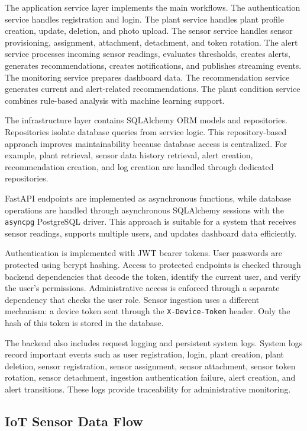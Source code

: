 The application service layer implements the main workflows. The authentication service handles registration and login. The plant service handles plant profile creation, update, deletion, and photo upload. The sensor service handles sensor provisioning, assignment, attachment, detachment, and token rotation. The alert service processes incoming sensor readings, evaluates thresholds, creates alerts, generates recommendations, creates notifications, and publishes streaming events. The monitoring service prepares dashboard data. The recommendation service generates current and alert-related recommendations. The plant condition service combines rule-based analysis with machine learning support.

The infrastructure layer contains SQLAlchemy ORM models and repositories. Repositories isolate database queries from service logic. This repository-based approach improves maintainability because database access is centralized. For example, plant retrieval, sensor data history retrieval, alert creation, recommendation creation, and log creation are handled through dedicated repositories.

FastAPI endpoints are implemented as asynchronous functions, while database operations are handled through asynchronous SQLAlchemy sessions with the \texttt{asyncpg} PostgreSQL driver. This approach is suitable for a system that receives sensor readings, supports multiple users, and updates dashboard data efficiently.

Authentication is implemented with JWT bearer tokens. User passwords are protected using bcrypt hashing. Access to protected endpoints is checked through backend dependencies that decode the token, identify the current user, and verify the user's permissions. Administrative access is enforced through a separate dependency that checks the user role. Sensor ingestion uses a different mechanism: a device token sent through the \texttt{X-Device-Token} header. Only the hash of this token is stored in the database.

The backend also includes request logging and persistent system logs. System logs record important events such as user registration, login, plant creation, plant deletion, sensor registration, sensor assignment, sensor attachment, sensor token rotation, sensor detachment, ingestion authentication failure, alert creation, and alert transitions. These logs provide traceability for administrative monitoring.

\subsection{IoT Sensor Data Flow}
\label{subsec:iot-sensor-data-flow}

